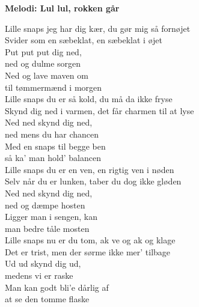 
\textbf{Melodi: Lul lul, rokken går}
\begin{flushleft}
Lille snaps jeg har dig kær, du gør mig så fornøjet\\
Svider som en sæbeklat, en sæbeklat i øjet\\
Put put put dig ned,\\
ned og dulme sorgen\\
Ned og lave maven om\\
til tømmermænd i morgen\\[5mm]

Lille snaps du er så kold, du må da ikke fryse\\
Skynd dig ned i varmen, det får charmen til at lyse\\
Ned ned skynd dig ned,\\
ned mens du har chancen\\
Med en snaps til begge ben\\
så ka' man hold' balancen\\[5mm]

Lille snaps du er en ven, en rigtig ven i nøden\\
Selv når du er lunken, taber du dog ikke gløden\\
Ned ned skynd dig ned,\\
ned og dæmpe hosten\\
Ligger man i sengen, kan\\
man bedre tåle mosten\\[5mm]

Lille snaps nu er du tom, ak ve og ak og klage\\
Det er trist, men der sørme ikke mer' tilbage\\
Ud ud skynd dig ud,\\
medens vi er raske\\
Man kan godt bli'e dårlig af\\
at se den tomme flaske\\
\end{flushleft}

